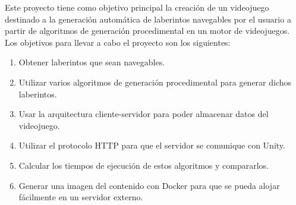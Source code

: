 Este proyecto tiene como objetivo principal la creación de un videojuego destinado a la generación automática de laberintos navegables por el usuario a partir de algoritmos de generación procedimental en un motor de videojuegos. Los objetivos para llevar a cabo el proyecto son los siguientes:

\begin{enumerate}
    \item Obtener laberintos que sean navegables.
    \item Utilizar varios algoritmos de generación procedimental para generar dichos laberintos.
    \item Usar la arquitectura cliente-servidor para poder almacenar datos del videojuego.
    \item Utilizar el protocolo HTTP para que el servidor se comunique con Unity.
    \item Calcular los tiempos de ejecución de estos algoritmos y compararlos.
    \item Generar una imagen del contenido con Docker para que se pueda alojar fácilmente en un servidor externo.
\end{enumerate}